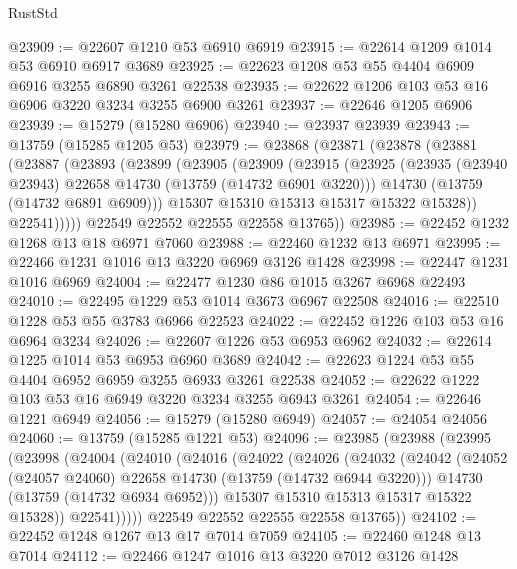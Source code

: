 \begin{lexlean}{RustStd}
\begin{coremodule}
@23909 := @22607 @1210 @53 @6910 @6919
@23915 := @22614 @1209 @1014 @53 @6910 @6917 @3689
@23925 := @22623 @1208 @53 @55 @4404 @6909 @6916 @3255 @6890 @3261 @22538
@23935 := @22622 @1206 @103 @53 @16 @6906 @3220 @3234 @3255 @6900 @3261
@23937 := @22646 @1205 @6906
@23939 := @15279 (@15280 @6906)
@23940 := @23937 @23939
@23943 := @13759 (@15285 @1205 @53)
@23979 := @23868
    (@23871
      (@23878
        (@23881
          (@23887
            (@23893
              (@23899
                (@23905
                  (@23909
                    (@23915
                      (@23925
                        (@23935 (@23940 @23943) @22658 @14730 (@13759 (@14732 @6901 @3220)))
                        @14730
                        (@13759 (@14732 @6891 @6909)))
                      @15307
                      @15310
                      @15313
                      @15317
                      @15322
                      @15328))
                  @22541)))))
        @22549
        @22552
        @22555
        @22558
        @13765))
@23985 := @22452 @1232 @1268 @13 @18 @6971 @7060
@23988 := @22460 @1232 @13 @6971
@23995 := @22466 @1231 @1016 @13 @3220 @6969 @3126 @1428
@23998 := @22447 @1231 @1016 @6969
@24004 := @22477 @1230 @86 @1015 @3267 @6968 @22493
@24010 := @22495 @1229 @53 @1014 @3673 @6967 @22508
@24016 := @22510 @1228 @53 @55 @3783 @6966 @22523
@24022 := @22452 @1226 @103 @53 @16 @6964 @3234
@24026 := @22607 @1226 @53 @6953 @6962
@24032 := @22614 @1225 @1014 @53 @6953 @6960 @3689
@24042 := @22623 @1224 @53 @55 @4404 @6952 @6959 @3255 @6933 @3261 @22538
@24052 := @22622 @1222 @103 @53 @16 @6949 @3220 @3234 @3255 @6943 @3261
@24054 := @22646 @1221 @6949
@24056 := @15279 (@15280 @6949)
@24057 := @24054 @24056
@24060 := @13759 (@15285 @1221 @53)
@24096 := @23985
    (@23988
      (@23995
        (@23998
          (@24004
            (@24010
              (@24016
                (@24022
                  (@24026
                    (@24032
                      (@24042
                        (@24052 (@24057 @24060) @22658 @14730 (@13759 (@14732 @6944 @3220)))
                        @14730
                        (@13759 (@14732 @6934 @6952)))
                      @15307
                      @15310
                      @15313
                      @15317
                      @15322
                      @15328))
                  @22541)))))
        @22549
        @22552
        @22555
        @22558
        @13765))
@24102 := @22452 @1248 @1267 @13 @17 @7014 @7059
@24105 := @22460 @1248 @13 @7014
@24112 := @22466 @1247 @1016 @13 @3220 @7012 @3126 @1428

\end{coremodule}
\end{lexlean}
